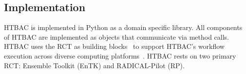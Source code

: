 


\subsection{Implementation}

HTBAC is implemented in Python as a domain specific library. All components
of HTBAC are implemented as objects that communicate via method calls.
HTBAC uses the RCT as building blocks~\cite{review_bb_2016} to support
HTBAC's workflow execution across diverse computing
platforms~\cite{turilli2017comprehensive}. HTBAC rests on two primary RCT:
Ensemble Toolkit (EnTK) and RADICAL-Pilot (RP).

